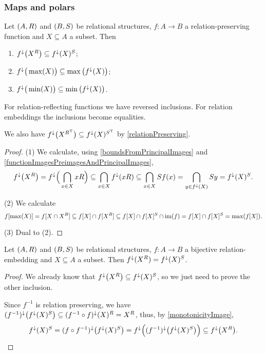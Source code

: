 \subsubsection{Maps and polars}

\begin{proposition} \label{imagePolars}
Let $\sSet{A, R}$ and $\sSet{B, S}$ be relational structures, $f: A\to B$ a relation-preserving function and $X\subseteq A$ a subset. Then
\begin{enumerate}
\item $f^\downarrow\big(X^R\big) \subseteq f^\downarrow(X)^S$;
\item $f^\downarrow\big(\max(X)\big) \subseteq \max\big(f^\downarrow(X)\big)$;
\item $f^\downarrow\big(\min(X)\big) \subseteq \min\big(f^\downarrow(X)\big)$.
\end{enumerate}
For relation-reflecting functions we have reversed inclusions. For relation embeddings the inclusions become equalities.
\end{proposition}
We also have $f^\downarrow\big(X^{R^{\mathrm{T}}}\big) \subseteq f^\downarrow(X)^{S^{\mathrm{T}}}$ by \ref{relationPreserving}.
\begin{proof}
(1) We calculate, using \ref{boundsFromPrincipalImages} and \ref{functionImagesPreimagesAndPrincipalImages},
\[ f^\downarrow\big(X^R\big) = f^\downarrow\Big(\bigcap_{x\in X}xR\Big) \subseteq \bigcap_{x\in X}f^\downarrow(xR) \subseteq \bigcap_{x\in X}Sf(x) = \bigcap_{y\in f^\downarrow(X)} Sy =  f^\downarrow(X)^S. \]

(2) We calculate
\[ f[\max(X)] = f[X\cap X^R] \subseteq f[X]\cap f[X^R] \subseteq f[X]\cap f[X]^S \cap \operatorname{im}(f) = f[X]\cap f[X]^S = \max(f[X]). \]

(3) Dual to (2).
\end{proof}
\begin{corollary} \label{relationIsomorphismSamePolars}
Let $\sSet{A, R}$ and $\sSet{B, S}$ be relational structures, $f: A\to B$ a bijective relation-embedding and $X\subseteq A$ a subset. Then $f^\downarrow(X^R) = f^\downarrow(X)^S$.
\end{corollary}
\begin{proof}
We already know that $f^\downarrow\big(X^R\big) \subseteq f^\downarrow(X)^S$, so we just need to prove the other inclusion.

Since $f^{-1}$ is relation preserving, we have $(f^{-1})^\downarrow\big(f^\downarrow(X)^S\big) \subseteq (f^{-1}\circ f)^\downarrow(X)^R = X^R$, thus, by \ref{monotonicityImage}, 
\[ f^\downarrow(X)^S = (f\circ f^{-1})^\downarrow\big(f^\downarrow(X)^S\big) = f^\downarrow\Big((f^{-1})^\downarrow\big(f^\downarrow(X)^S\big)\Big) \subseteq f^\downarrow\big(X^R\big). \]
\end{proof}

